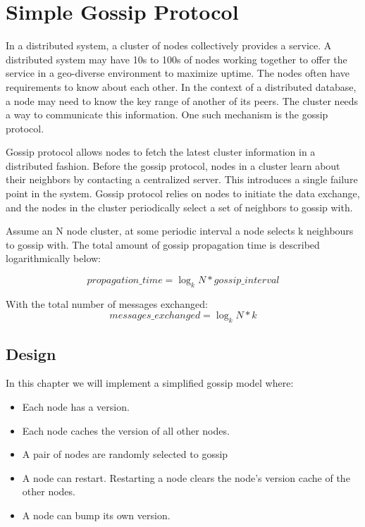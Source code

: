 % 


\chapter{Simple Gossip Protocol}

In a distributed system, a cluster of nodes collectively provides a service. A
distributed system may have 10s to 100s of nodes working together to offer the
service in a geo-diverse environment to maximize uptime. The nodes often
have requirements to know about each other. In the context of a distributed
database, a node may need to know the key range of another of its peers. The
cluster needs a way to communicate this information. One such mechanism is the
gossip protocol.\newline

Gossip protocol allows nodes to fetch the latest cluster information in a
distributed fashion. Before the gossip protocol, nodes in a cluster learn about
their neighbors by contacting a centralized server. This introduces a single
failure point in the system. Gossip protocol relies on nodes to initiate
the data exchange, and the nodes in the cluster periodically select a set of neighbors to
gossip with. \newline

Assume an N node cluster, at some periodic interval a node selects k neighbours
to gossip with. The total amount of gossip propagation time is described
logarithmically below:

\begin{equation}
    propagation\_time = \log_k N * gossip\_interval
\end{equation}

With the total number of messages exchanged:
\begin{equation}
    messages\_exchanged = \log_k N * k
\end{equation}

\section{Design}

In this chapter we will implement a simplified gossip model where: 
\begin{itemize}
    \item Each node has a version.
    \item Each node caches the version of all other nodes.
    \item A pair of nodes are randomly selected to gossip 
    \item A node can restart. Restarting a node clears the node's version cache
    of the other nodes.
    \item A node can bump its own version.
\end{itemize}

